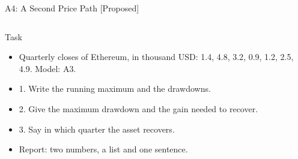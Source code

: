 \begin{frame}{A4: A Second Price Path [Proposed]}
\propsub
\itemsize{\scriptsize}
\begin{columns}[T]
\begin{column}{\taskw}
\begin{block}{Task}
\begin{itemize}
    \item Quarterly closes of Ethereum, in thousand USD: 1.4, 4.8, 3.2, 0.9, 1.2, 2.5, 4.9. Model: A3.
    \item 1. Write the running maximum and the drawdowns.
    \item 2. Give the maximum drawdown and the gain needed to recover.
    \item 3. Say in which quarter the asset recovers.
    \item Report: two numbers, a list and one sentence.
\end{itemize}
\end{block}
\end{column}
\begin{column}{\solw}
\end{column}
\end{columns}
\end{frame}


